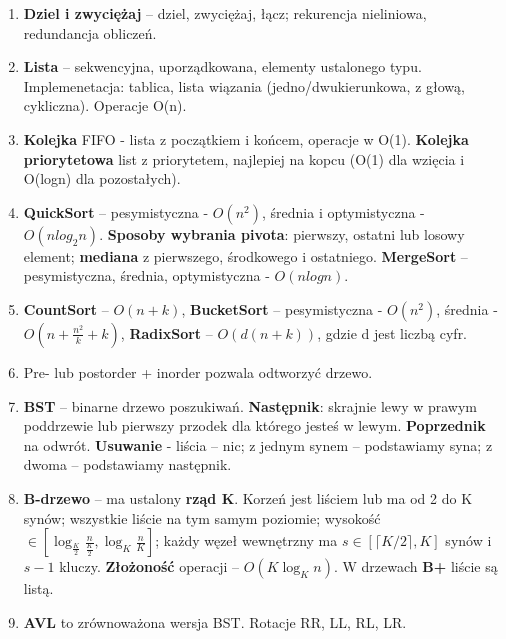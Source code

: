\documentclass[12pt]{article}
\begin{document}
\begin{enumerate}
        \item \textbf{Dziel i zwyciężaj} -- dziel, zwyciężaj, łącz;
        rekurencja nieliniowa, redundancja obliczeń.

        \item \textbf{Lista} -- sekwencyjna, uporządkowana, elementy ustalonego typu.
        Implemenetacja: tablica, lista
        wiązania (jedno/dwukierunkowa, z głową, cykliczna).
        Operacje O(n).

        \item \textbf{Kolejka} FIFO - lista z początkiem i końcem, operacje w O(1). \textbf{Kolejka priorytetowa}
        list z priorytetem, najlepiej na kopcu (O(1) dla wzięcia i O(logn)  dla pozostałych).

        \item \textbf{QuickSort} -- pesymistyczna - $O(n^2)$, średnia i optymistyczna - $O(nlog_2 n)$.
        \textbf{Sposoby wybrania pivota}: pierwszy, ostatni lub losowy element; \textbf{mediana} z pierwszego,
        środkowego i ostatniego. \textbf{MergeSort} -- pesymistyczna, średnia, optymistyczna - $O(nlogn)$.

        \item \textbf{CountSort} -- $O(n+k)$, \textbf{BucketSort} -- pesymistyczna -  $O(n^2)$, średnia -
        $O\left(n + \frac{n^2}{k} + k\right)$, \textbf{RadixSort} -- $O(d(n+k))$, gdzie d jest liczbą cyfr.

        \item Pre- lub postorder + inorder pozwala odtworzyć drzewo.

        \item \textbf{BST} -- binarne drzewo poszukiwań. \textbf{Następnik}: skrajnie lewy w prawym poddrzewie lub pierwszy
        przodek dla którego jesteś w lewym. \textbf{Poprzednik} na odwrót. \textbf{Usuwanie} - liścia -- nic;
        z jednym
        synem -- podstawiamy syna;
        z dwoma -- podstawiamy następnik.

        \item \textbf{B-drzewo} -- ma ustalony \textbf{rząd K}.
        Korzeń jest liściem lub ma od 2 do K synów;
        wszystkie liście na tym samym poziomie;
        wysokość $\in [\log_{\frac{K}{2}} \frac{n}{\frac{K}{2}}, \log_{K} \frac{n}{K}]$;
        każdy węzeł wewnętrzny ma  $s \in [\lceil K/2 \rceil, K]$ synów i $s-1$ kluczy. \textbf{Złożoność}
        operacji -- $O(K \log_{K} n)$.
        W drzewach \textbf{B+} liście są listą.

        \item \textbf{AVL} to zrównoważona wersja BST. Rotacje RR, LL, RL, LR\@.


\end{enumerate}
\end{document}
